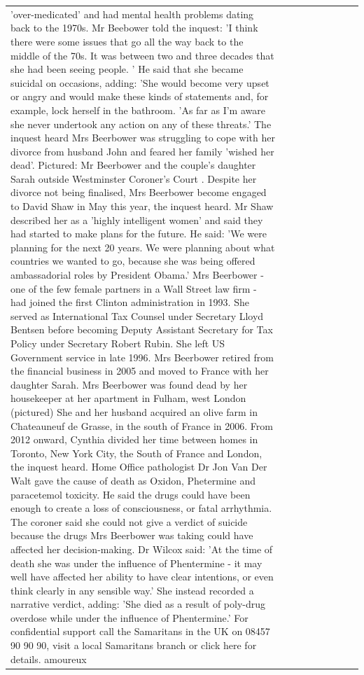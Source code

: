 \begin{table}[H]
\begin{tabular}{lllrlllll}
'over-medicated' and had mental health problems dating back to the 1970s. Mr Beebower told the inquest: 'I think there were some issues that go all the way back to the middle of the 70s. It was between two and three decades that she had been seeing people. ' He said that she became suicidal on occasions, adding: 'She would become very upset or angry and would make these kinds of statements and, for example, lock herself in the bathroom. 'As far as I'm aware she never undertook any action on any of these threats.' The inquest heard Mrs Beerbower was struggling to cope with her divorce from husband John and feared her family 'wished her dead'. Pictured: Mr Beerbower and the couple's daughter Sarah outside Westminster Coroner's Court . Despite her divorce not being finalised, Mrs Beerbower become engaged to David Shaw in May this year, the inquest heard. Mr Shaw described her as a 'highly intelligent women' and said they had started to make plans for the future. He said: 'We were planning for the next 20 years. We were planning about what countries we wanted to go, because she was being offered ambassadorial roles by President Obama.' Mrs Beerbower - one of the few female partners in a Wall Street law firm - had joined the first Clinton administration in 1993. She served as International Tax Counsel under Secretary Lloyd Bentsen before becoming Deputy Assistant Secretary for Tax Policy under Secretary Robert Rubin. She left US Government service in late 1996. Mrs Beerbower retired from the financial business in 2005 and moved to France with her daughter Sarah. Mrs Beerbower was found dead by her housekeeper at her apartment in Fulham, west London (pictured) She and her husband acquired an olive farm in Chateauneuf de Grasse, in the south of France in 2006. From 2012 onward, Cynthia divided her time between homes in Toronto, New York City, the South of France and London, the inquest heard. Home Office pathologist Dr Jon Van Der Walt gave the cause of death as Oxidon, Phetermine and paracetemol toxicity. He said the drugs could have been enough to create a loss of consciousness, or fatal arrhythmia. The coroner said she could not give a verdict of suicide because the drugs Mrs Beerbower was taking could have affected her decision-making. Dr Wilcox said: 'At the time of death she was under the influence of Phentermine - it may well have affected her ability to have clear intentions, or even think clearly in any sensible way.' She instead recorded a narrative verdict, adding: 'She died as a result of poly-drug overdose while under the influence of Phentermine.' For confidential support call the Samaritans in the UK on 08457 90 90 90, visit a local Samaritans branch or click here for details. amoureux \\

\end{tabular}
\end{table}
